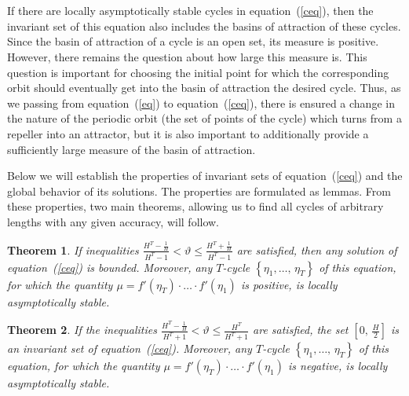 \documentclass[12pt,a4paper]{amsart}
\newtheorem{theorem}{Theorem}
\begin{document}
\section{}

If there are locally asymptotically stable cycles in equation~(\ref{ceq}), then the invariant set of this equation also includes the basins of 
attraction of these cycles. Since the basin of attraction of a cycle is an open set, its measure is positive. However, there remains the question 
about how large this measure is. This question is important for choosing the initial point for which the corresponding orbit should eventually 
get into the basin of attraction the desired cycle. Thus, as we passing from equation~(\ref{eq}) to equation~(\ref{ceq}), there is ensured a change 
in the nature of the periodic orbit (the set of points of the cycle) which turns from a repeller into an attractor, but it is also important 
to additionally provide a sufficiently large measure of the basin of attraction. 

Below we will establish the properties of invariant sets of equation~(\ref{ceq}) and the global behavior of its solutions. 
The properties are formulated as lemmas. From these properties, two main theorems, allowing us to find all cycles of arbitrary 
lengths with any given accuracy, will follow. 

\begin{theorem}\label{t2}
If inequalities $\frac{H^T-\frac{1}{H}}{H^T-1}<\vartheta\leq\frac{H^T+\frac1H}{H^T-1}$ are satisfied, then any solution of equation~(\ref{ceq}) is bounded. Moreover, any $T$-cycle $\left\{\eta_1,\ldots,\,\eta_T\right\}$ 
of this equation, for which the quantity $\mu = f'(\eta_T)\cdot\ldots\cdot f'(\eta_1)$ is positive, is locally asymptotically stable.
\end{theorem}

\begin{theorem}\label{t3}
If the inequalities $\frac{H^T-\frac{1}{H}}{H^T+1}<\vartheta\leq\frac{H^T}{H^T+1}$ are satisfied, the set $\left[0,\,\frac{H}{2}\right]$ is an invariant set
of equation~(\ref{ceq}). Moreover, any $T$-cycle $\left\{\eta_1,\ldots,\,\eta_T\right\}$ of this equation, for which the quantity 
$\mu = f'(\eta_T)\cdot\ldots\cdot f'(\eta_1)$ is negative, is locally asymptotically stable.
\end{theorem}
\end{document}
